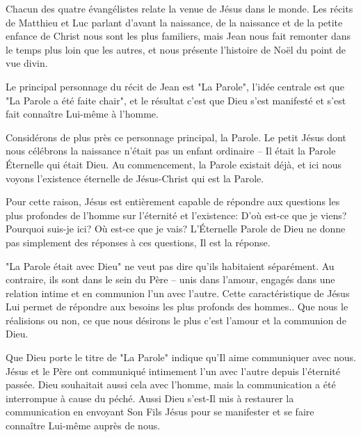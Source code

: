 

Chacun des quatre évangélistes relate la venue de Jésus dans le monde. Les récits de Matthieu et Luc parlant d'avant la naissance, de la naissance et de la petite enfance de Christ nous sont les plus familiers, mais Jean nous fait remonter dans le temps plus loin que les autres, et nous présente l'histoire de Noël du point de vue divin.

Le principal personnage du récit de Jean est "La Parole", l'idée centrale est que "La Parole a été faite chair", et le résultat c'est que Dieu s'est manifesté et s'est fait connaître Lui-même à l'homme.

Considérons de plus près ce personnage principal, la Parole. Le petit Jésus dont nous célébrons la naissance n'était pas un enfant ordinaire – Il était la Parole Éternelle qui était Dieu. Au commencement, la Parole existait déjà, et ici nous voyons l'existence éternelle de Jésus-Christ qui est la Parole.

Pour cette raison, Jésus est entièrement capable de répondre aux questions les plus profondes de l'homme sur l'éternité et l'existence: D'où est-ce que je viens? Pourquoi suis-je ici? Où est-ce que je vais? L'Éternelle Parole de Dieu ne donne pas simplement des réponses à ces questions, Il est la réponse.

"La Parole était avec Dieu" ne veut pas dire qu'ils habitaient séparément. Au contraire, ils sont dans le sein du Père – unis dans l'amour, engagés dans une relation intime et en communion l'un avec l'autre. Cette caractéristique de Jésus Lui permet de répondre aux besoins les plus profonds des hommes.. Que nous le réalisions ou non, ce que nous désirons le plus c'est l'amour et la communion de Dieu.

Que Dieu porte le titre de "La Parole" indique qu'Il aime communiquer avec nous. Jésus et le Père ont communiqué intimement l'un avec l'autre depuis l'éternité passée. Dieu souhaitait aussi cela avec l'homme, mais la communication a été interrompue à cause du péché. Aussi Dieu s'est-Il mis à restaurer la communication en envoyant Son Fils Jésus pour se manifester et se faire connaître Lui-même auprès de nous.

